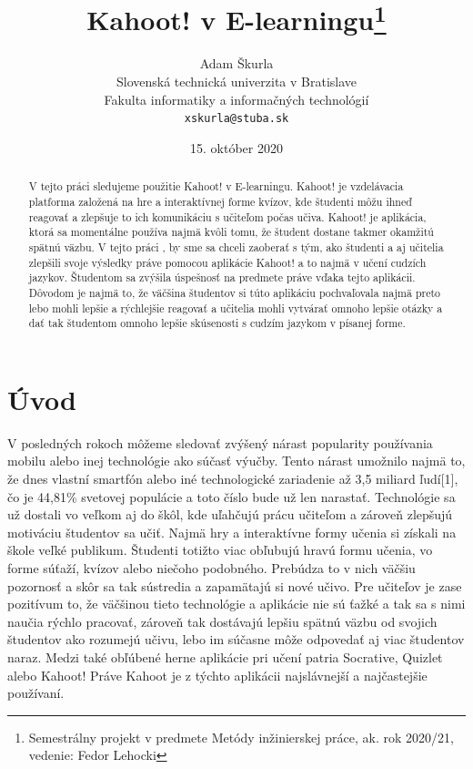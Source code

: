 \documentclass[10pt,oneside,slovak,a4paper]{article}
\title{Kahoot! v E-learningu\thanks{Semestrálny projekt v predmete Metódy inžinierskej práce, ak. rok 2020/21, vedenie: Fedor Lehocki}} %
\author{Adam Škurla\\[2pt]
	{\small Slovenská technická univerzita v Bratislave}\\
	{\small Fakulta informatiky a informačných technológií}\\
	{\small \texttt{xskurla@stuba.sk}}
	}
\date{\small 15. október 2020}
\begin{document}
\maketitle

\begin{abstract}
V tejto práci sledujeme použitie Kahoot! v E-learningu. Kahoot! je vzdelávacia platforma založená na hre a interaktívnej forme kvízov, kde študenti môžu ihneď reagovať a zlepšuje to ich komunikáciu s učiteľom počas učiva. Kahoot! je aplikácia, ktorá sa momentálne používa najmä kvôli tomu, že študent dostane takmer okamžitú spätnú väzbu. V tejto práci , by sme sa chceli zaoberať s tým, ako študenti a aj učitelia zlepšili svoje výsledky práve pomocou aplikácie Kahoot! a to najmä v učení cudzích jazykov. Študentom sa zvýšila úspešnosť na predmete práve vďaka tejto aplikácii. Dôvodom je najmä to, že väčšina študentov si túto aplikáciu pochvaľovala najmä preto lebo mohli lepšie a rýchlejšie reagovať a učitelia mohli vytvárať omnoho lepšie otázky a dať tak študentom omnoho lepšie skúsenosti s cudzím jazykom v písanej forme.
\end{abstract}



\section{Úvod}

V posledných rokoch môžeme sledovať zvýšený nárast popularity používania mobilu alebo inej technológie ako súčasť výučby. Tento nárast umožnilo najmä to, že dnes  vlastní smartfón alebo iné technologické zariadenie až 3,5 miliard ľudí[1], čo je 44,81\% svetovej populácie a toto číslo bude už len narastať. Technológie sa už dostali vo veľkom aj do škôl, kde uľahčujú prácu učiteľom a zároveň zlepšujú motiváciu študentov sa učiť. Najmä hry a interaktívne formy učenia si získali na škole veľké publikum. Študenti totižto viac obľubujú hravú formu učenia, vo forme súťaží, kvízov alebo niečoho podobného. Prebúdza to v nich väčšiu pozornosť a skôr sa tak sústredia a zapamätajú si nové učivo. Pre učiteľov je zase pozitívum to, že väčšinou tieto technológie a aplikácie nie sú ťažké a tak sa s nimi naučia rýchlo pracovať, zároveň tak dostávajú lepšiu spätnú väzbu od svojich študentov ako rozumejú učivu, lebo im súčasne môže odpovedať aj viac študentov naraz. Medzi také obľúbené herne aplikácie pri učení patria Socrative, Quizlet alebo Kahoot! Práve Kahoot je z týchto aplikácii najslávnejší a najčastejšie používaní.  
\end{document}
